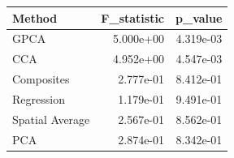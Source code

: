 \begin{tabular}{lrr}
\toprule
Method & F_statistic & p_value \\
\midrule
GPCA & 5.000e+00 & 4.319e-03 \\
CCA & 4.952e+00 & 4.547e-03 \\
Composites & 2.777e-01 & 8.412e-01 \\
Regression & 1.179e-01 & 9.491e-01 \\
Spatial Average & 2.567e-01 & 8.562e-01 \\
PCA & 2.874e-01 & 8.342e-01 \\
\bottomrule
\end{tabular}
